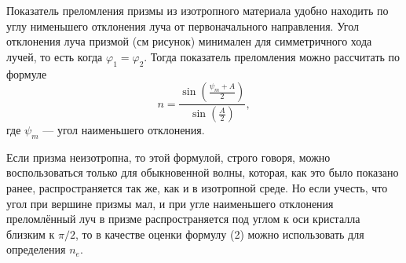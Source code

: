 \documentclass[a0paper,portrait]{baposter}
\begin{document}
\begin{poster}
{Показатель преломления призмы из изотропного материала удобно находить по углу нименьшего отклонения луча от первоначального направления. Угол отклонения луча призмой (см рисунок) минимален для симметричного хода лучей, то есть когда $\varphi_1 = \varphi_2$. Тогда показатель преломления можно рассчитать по формуле
\begin{equation}
n=\frac{\sin \left(\frac{\psi_{m}+A}{2}\right)}{\sin \left(\frac{A}{2}\right)},
\end{equation}
где $\psi_m$ --- угол наименьшего отклонения.

Если призма неизотропна, то этой формулой, строго говоря, можно воспользоваться только для обыкновенной волны, которая, как это было показано ранее, распространяется так же, как и в изотропной среде. Но если учесть, что угол при вершине призмы мал, и при угле наименьшего отклонения преломлённый луч в призме распространяется под углом к оси кристалла близким к $\pi / 2$, то в качестве оценки формулу (2) можно использовать для определения $n_e$.
}


\end{poster}
  
\end{document}
